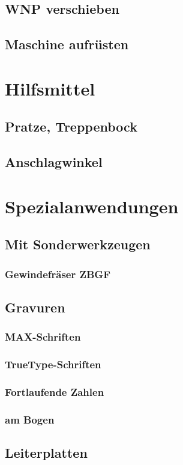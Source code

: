 \documentclass[14pt,a4paper]{book}
\begin{document}
		\subsection{WNP verschieben} 
		\subsection{Maschine aufrüsten}
	\section{Hilfsmittel} 
		\subsection{Pratze, Treppenbock} 
		\subsection{Anschlagwinkel} 		 
	\section{Spezialanwendungen} 
		\subsection{Mit Sonderwerkzeugen}
			\subsubsection{Gewindefräser ZBGF} 
		\subsection{Gravuren} 
			\subsubsection{MAX-Schriften} 
			\subsubsection{TrueType-Schriften} 
			\subsubsection{Fortlaufende Zahlen}
			\subsubsection{am Bogen}
		\subsection{Leiterplatten} 
\end{document}
